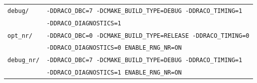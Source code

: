 \documentclass[note]{ResearchNote_pdf}
\begin{document}
\begin{center}
  \footnotesize
  \begin{tabular}{lp{4.0in}}
    \hline\hline
\texttt{debug/}  
     & \texttt{-DDRACO\_DBC=7 -DCMAKE\_BUILD\_TYPE=DEBUG  -DDRACO\_TIMING=1} \\
     & \texttt{-DDRACO\_DIAGNOSTICS=1} \\


\texttt{opt\_nr/}  
     & \texttt{-DDRACO\_DBC=0 -DCMAKE\_BUILD\_TYPE=RELEASE  -DDRACO\_TIMING=0} \\
     & \texttt{-DDRACO\_DIAGNOSTICS=0 ENABLE\_RNG\_NR=ON} \\


\texttt{debug\_nr/}  
     & \texttt{-DDRACO\_DBC=7 -DCMAKE\_BUILD\_TYPE=DEBUG  -DDRACO\_TIMING=1} \\
     & \texttt{-DDRACO\_DIAGNOSTICS=1  ENABLE\_RNG\_NR=ON} \\





    \hline\hline
  \end{tabular}
\end{center}
\end{document}
